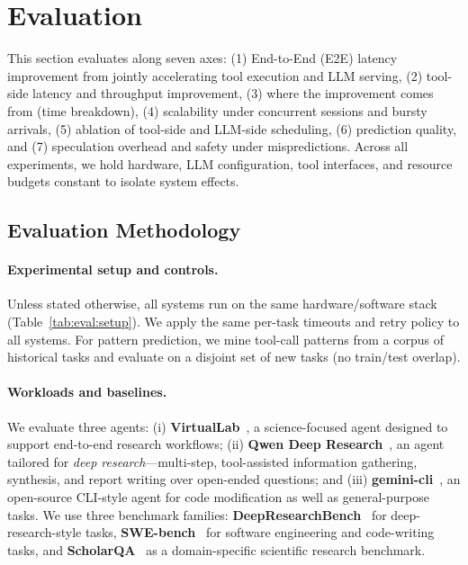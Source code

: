 \section{Evaluation}

This section evaluates \sys along seven axes: (1) End-to-End (E2E) latency improvement from jointly accelerating tool execution and LLM serving, (2) tool-side latency and throughput improvement, (3) where the improvement comes from (time breakdown), (4) scalability under concurrent sessions and bursty arrivals, (5) ablation of tool-side and LLM-side scheduling, (6) prediction quality, and (7) speculation overhead and safety under mispredictions.
Across all experiments, we hold hardware, LLM configuration, tool interfaces, and resource budgets constant to isolate system effects.

\subsection{Evaluation Methodology}
\label{sec:eval:method}

\paragraph{Experimental setup and controls.}
Unless stated otherwise, all systems run on the same hardware/software stack (Table~\ref{tab:eval:setup}).
We apply the same per-task timeouts and retry policy to all systems.
%
For pattern prediction, we mine tool-call patterns from a corpus of historical tasks and evaluate on a disjoint set of new tasks (no train/test overlap).


\paragraph{Workloads and baselines.}
We evaluate three agents: (i) \textbf{VirtualLab}~\cite{Swanson2025VirtualLab}, a science-focused agent designed to support end-to-end research workflows; (ii) \textbf{Qwen Deep Research}~\cite{alibabaNLP_deepresearch_repo}, an agent tailored for \emph{deep research}---multi-step, tool-assisted information gathering, synthesis, and report writing over open-ended questions; and (iii) \textbf{gemini-cli}~\cite{GeminiCLIBuild2025}, an open-source CLI-style agent for code modification as well as general-purpose tasks.
We use three benchmark families: \textbf{DeepResearchBench}~\cite{deep-research-bench} for deep-research-style tasks, \textbf{SWE-bench}~\cite{swebench} for software engineering and code-writing tasks, and \textbf{ScholarQA}~\cite{scholarQA} as a domain-specific scientific research benchmark.

